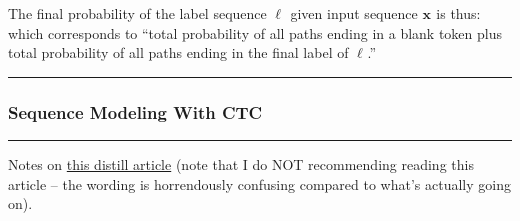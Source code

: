 \documentclass[11pt]{article}
\renewcommand\vec[2][]{\bm{#2}_{#1}}
\newcommand\myspace[1][]{\vspace{#1\bigskipamount}}
\newcommand\p{\Needspace{10\baselineskip} \noindent}
\newcommand\subsub[1]{\Needspace{15\baselineskip}\hrule\subsubsection{#1}\hrule}
\begin{document}
\begin{comment}
It's worth emphasizing how to interpret these, given we've imposed this weird augmented label sequence. In as-verbose-as-possible terms, 
\begin{quote}
{\bfseries
$\alpha_t(s)$ is the probability, after running our RNN for $t$ time steps to produce the path $\slice[t]{\pi}$, that $\mathcal{B}(\slice[t]{\pi}){==}\slice[ \frac{s - 1}{2} ]{\ell}$  for which, after inserting $\epsilon$ between all elements of $\slice[ \frac{s-1}{2} ]{\ell}$, we obtain the augmented labeling $\slice[s]{\ell}'$.
}
\end{quote}

\p The way you should think about the different possible cases here is that, at time step $t$, in order for there to be nonzero probability that we can merge the sequence of $t$ RNN outputs into the augmented label sequence $\slice[s]{\ell}'$, it must be true that:
\begin{compactitem}
	\item We emit the token $\ell'_s$ at time $t$ from the RNN. 
	
	\item At the previous timestep, $t  - 1$, we emitted a token consistent with our rules for merging combined with the fact that we've inserted $\epsilon$ between every pair of tokens in the final output labeling $\vec\ell$, in order to produce $\vec{\ell}'$. 
\end{compactitem}
The weird case (in my opinion) to consider is realizing that we can emit, for example, the label $a$ at time $t - 1$, then the label $b$ at time $t$, and this would eventually get mapped to a portion of the augmented label sequence, $[a, \epsilon, b]$. 
\end{comment}

The final probability of the label sequence $\vec\ell$ given input sequence $\vec x$ is thus:
\graybox{
	p(\vec\ell \mid \vec x) &= \alpha_T(|\vec{\ell}'|) + \alpha_T(|\vec{\ell}'|-1) 
}
which  corresponds to ``total probability of all paths ending in a blank token plus total probability of all paths ending in the final label of $\vec\ell$.''




\myspace
\subsub{Sequence Modeling With CTC}
\myspace

Notes on \href{https://distill.pub/2017/ctc/}{this distill article} (note that I do NOT recommending reading this article -- the wording is horrendously confusing compared to what's actually going on). 
\end{document}
